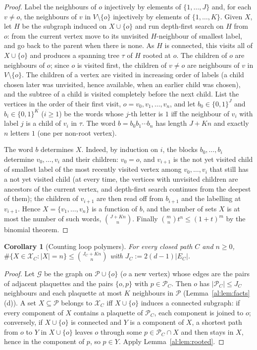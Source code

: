 \documentclass[11pt,a4paper]{article}
\newtheorem{corollary}[theorem]{Corollary}
\theoremstyle{definition}
\theoremstyle{remark}
\newcommand{\cP}{\mathcal{P}}
\newcommand{\cX}{\mathcal{X}}
\begin{document}
\begin{proof}
Label the neighbours of $o$ injectively by elements of $\{1,\dots,J\}$ and, for each $v\neq o$, the neighbours of $v$ in
$V\setminus\{o\}$ injectively by elements of $\{1,\dots,K\}$. Given $X$, let $H$ be the subgraph induced on $X\cup\{o\}$
and run depth-first search on $H$ from $o$: from the current vertex move to its unvisited $H$-neighbour of smallest
label, and go back to the parent when there is none. As $H$ is connected, this visits all of $X\cup\{o\}$ and produces a
spanning tree $\tau$ of $H$ rooted at $o$. The children of $o$ are neighbours of $o$; since $o$ is visited first, the
children of $v\neq o$ are neighbours of $v$ in $V\setminus\{o\}$. The children of a vertex are visited in increasing order
of labels (a child chosen later was unvisited, hence available, when an earlier child was chosen), and the subtree of a
child is visited completely before the next child. List the vertices in the order of their first visit,
$o=v_0,v_1,\dots,v_n$, and let $b_0\in\{0,1\}^J$ and $b_i\in\{0,1\}^K$ ($i\ge1$) be the words whose $j$-th letter is $1$
iff the neighbour of $v_i$ with label $j$ is a child of $v_i$ in $\tau$. The word $b=b_0b_1\cdots b_n$ has length $J+Kn$
and exactly $n$ letters $1$ (one per non-root vertex).

The word $b$ determines $X$. Indeed, by induction on $i$, the blocks $b_0,\dots,b_i$ determine $v_0,\dots,v_i$ and their
children: $v_0=o$, and $v_{i+1}$ is the not yet visited child of smallest label of the most recently visited vertex among
$v_0,\dots,v_i$ that still has a not yet visited child (at every time, the vertices with unvisited children are ancestors
of the current vertex, and depth-first search continues from the deepest of them); the children of $v_{i+1}$ are then
read off from $b_{i+1}$ and the labelling at $v_{i+1}$. Hence $X=\{v_1,\dots,v_n\}$ is a function of $b$, and the number of
sets $X$ is at most the number of such words, $\binom{J+Kn}n$. Finally $\binom mn t^n\le(1+t)^m$ by the binomial theorem.
\end{proof}

\begin{corollary}[Counting loop polymers]\label{al:cor:countloop}
For every closed path $C$ and $n\ge0$, $\#\{X\in\cX_C:|X|=n\}\le\binom{J_C+Kn}{n}$ with $J_C:=2(d-1)|E_C|$.
\end{corollary}

\begin{proof}
Let $\mathcal G$ be the graph on $\cP\cup\{o\}$ ($o$ a new vertex) whose edges are the pairs of adjacent plaquettes and the
pairs $\{o,p\}$ with $p\in\cP_C$. Then $o$ has $|\cP_C|\le J_C$ neighbours and each plaquette at most $K$ neighbours in
$\cP$ (Lemma~\ref{al:lem:facts}(d)). A set $X\subseteq\cP$ belongs to $\cX_C$ iff $X\cup\{o\}$ induces a connected
subgraph: if every component of $X$ contains a plaquette of $\cP_C$, each component is joined to $o$; conversely, if
$X\cup\{o\}$ is connected and $Y$ is a component of $X$, a shortest path from $o$ to $Y$ in $X\cup\{o\}$ leaves $o$ through
some $p\in\cP_C\cap X$ and then stays in $X$, hence in the component of $p$, so $p\in Y$. Apply
Lemma~\ref{al:lem:rooted}.
\end{proof}
\end{document}
